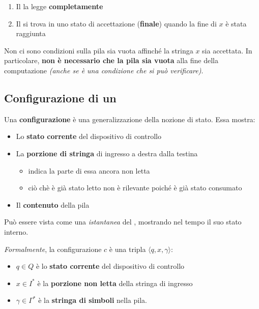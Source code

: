 \documentclass[italian, 10pt]{article}
\begin{document}
\begin{enumerate}
  \item Il \PDA la legge \textbf{completamente}
  \item Il \PDA si trova in uno stato di accettazione (\textbf{finale}) quando la fine di \(x\) è stata raggiunta
\end{enumerate}

Non ci sono condizioni sulla pila sia vuota affinché la stringa \(x\) sia accettata.
In particolare, \textbf{non è necessario che la pila sia vuota} alla fine della computazione \textit{(anche se è una condizione che si può verificare)}.

\subsection{Configurazione di un \PDA}
\label{sec:configurazione-PDA}

Una \textbf{configurazione} è una generalizzazione della nozione di stato.
Essa mostra:

\begin{itemize}
  \item Lo \textbf{stato corrente} del dispositivo di controllo
  \item La \textbf{porzione di stringa} di ingresso a destra dalla testina
        \begin{itemize}
          \item indica la parte di essa ancora non letta
          \item ciò chè è già stato letto non è rilevante poiché è già stato consumato
        \end{itemize}
  \item Il \textbf{contenuto} della pila
\end{itemize}

Può essere vista come una \textit{istantanea} del \PDA, mostrando nel tempo il suo stato interno.

\bigskip
\textit{Formalmente}, la configurazione \(c\) è una tripla \(\langle q, x, \gamma \rangle\):

\begin{itemize}
  \item \(q \in Q\) è lo \textbf{stato corrente} del dispositivo di controllo
  \item \(x \in I^\ast\) è la \textbf{porzione non letta} della stringa di ingresso
  \item \(\gamma \in \Gamma^\ast\) è la \textbf{stringa di simboli} nella pila.
\end{itemize}
\end{document}
